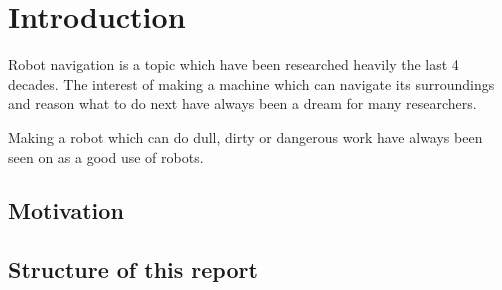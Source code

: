 
\chapter{Introduction}
Robot navigation is a topic which have been researched heavily the last 4 decades. The
interest of making a machine which can navigate its surroundings and reason what to do
next have always been a dream for many researchers. 

Making a robot which can do dull, dirty or dangerous work have always been seen on as a
good use of robots. 



\section{Motivation}



\section{Structure of this report}


